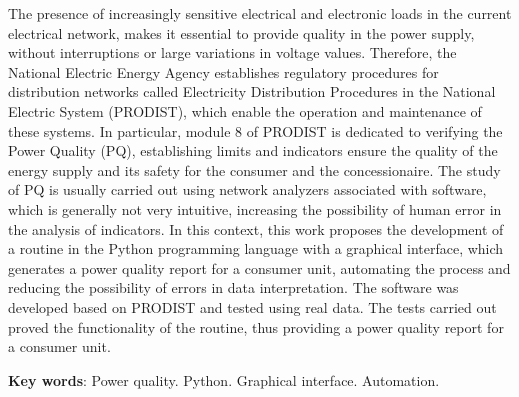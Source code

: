 \begin{resumo}[ABSTRACT]
  \begin{SingleSpacing}
    The presence of increasingly sensitive electrical and electronic loads in the current electrical network, makes it essential to provide quality in the power supply, without interruptions or large variations in voltage values. Therefore, the National Electric Energy Agency establishes regulatory procedures for distribution networks called Electricity Distribution Procedures in the National Electric System (PRODIST), which enable the operation and maintenance of these systems. In particular, module 8 of PRODIST is dedicated to verifying the Power Quality (PQ), establishing limits and indicators ensure the quality of the energy supply and its safety for the consumer and the concessionaire. The study of PQ is usually carried out using network analyzers associated with software, which is generally not very intuitive, increasing the possibility of human error in the analysis of indicators. In this context, this work proposes the development of a routine in the Python programming language with a graphical interface, which generates a power quality report for a consumer unit, automating the process and reducing the possibility of errors in data interpretation. The software was developed based on PRODIST and tested using real data. The tests carried out proved the functionality of the routine, thus providing a power quality report for a consumer unit.
  \end{SingleSpacing}

  \vspace{\onelineskip}
  \textbf{Key words}: Power quality. Python. Graphical interface. Automation.
\end{resumo}